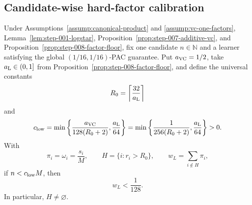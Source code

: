 \subsection{Candidate-wise hard-factor calibration}
\label{app:step-009}

\begin{lemma}
\label{lem:step-009-low-mass}
Under Assumptions~\ref{assump:canonical-product} and
\ref{assump:vc-one-factors}, Lemma~\ref{lem:step-001-logstar},
Proposition~\ref{prop:step-007-additive-vc}, and
Proposition~\ref{prop:step-008-factor-floor}, fix one candidate
\(n\in\mathbb N\) and a learner satisfying the global
\((1/16,1/16)\)-PAC guarantee.  Put
\(a_{\rm VC}=1/2\), take \(a_{\rm L}\in(0,1]\) from
Proposition~\ref{prop:step-008-factor-floor}, and define the universal
constants
\begin{equation}\label{eq:step-009-rzero}
R_0=\left\lceil\frac{32}{a_{\rm L}}\right\rceil
\end{equation}
and
\begin{equation}\label{eq:step-009-clow}
c_{\rm low}
=\min\left\{
\frac{a_{\rm VC}}{128(R_0+2)},\frac{a_{\rm L}}{64}
\right\}
=\min\left\{
\frac1{256(R_0+2)},\frac{a_{\rm L}}{64}
\right\}>0.
\end{equation}
With
\begin{equation}\label{eq:step-009-hard-set}
\pi_i=\omega_i=\frac{s_i}{M},
\qquad
H=\{i:r_i>R_0\},
\qquad
w_L=\sum_{i\notin H}\pi_i,
\end{equation}
if \(n<c_{\rm low}M\), then
\begin{equation}\label{eq:step-009-low-mass}
w_L<\frac1{128}.
\end{equation}
In particular, \(H\ne\varnothing\).
\end{lemma}

